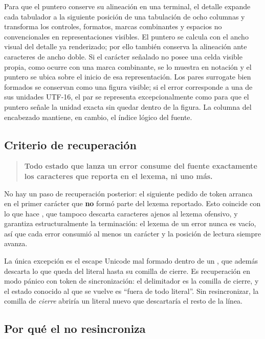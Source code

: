 \documentclass[11pt,a4paper]{article}
\begin{document}
Para que el puntero conserve su alineación en una terminal, el detalle expande cada tabulador a la
siguiente posición de una tabulación de ocho columnas y transforma los controles, formatos, marcas
combinantes y espacios no convencionales en representaciones visibles. El puntero se calcula con el
ancho visual del detalle ya renderizado; por ello también conserva la alineación ante caracteres de
ancho doble. Si el carácter señalado no posee una celda visible propia, como ocurre con una marca
combinante, se lo muestra en notación  y el puntero se ubica sobre el inicio de esa
representación. Los pares surrogate bien formados se conservan como una figura visible; si el error
corresponde a una de sus unidades UTF-16, el par se representa excepcionalmente como
 para que el puntero señale la unidad exacta sin quedar dentro de la figura.
La columna del encabezado mantiene, en cambio, el índice lógico del fuente.

\subsection{Criterio de recuperación}

\begin{quote}
\textbf{Todo estado que lanza un error consume del fuente exactamente los caracteres que reporta en
el lexema, ni uno más.}
\end{quote}

No hay un paso de recuperación posterior: el siguiente pedido de token arranca en el primer carácter
que \textbf{no} formó parte del lexema reportado. Esto coincide con lo que hace , que
tampoco descarta caracteres ajenos al lexema ofensivo, y garantiza estructuralmente la terminación:
el lexema de un error nunca es vacío, así que cada error consumió al menos un carácter y la posición
de lectura siempre avanza.

La única excepción es el escape Unicode mal formado dentro de un , que además descarta
lo que queda del literal hasta su comilla de cierre. Es recuperación en modo pánico con token de
sincronización: el delimitador es la comilla de cierre, y el estado conocido al que se vuelve es
``fuera de todo literal''. Sin resincronizar, la comilla de \emph{cierre} abriría un literal nuevo
que descartaría el resto de la línea.

\subsection{Por qué el  no resincroniza}
\label{sec:asimetria}
\end{document}
